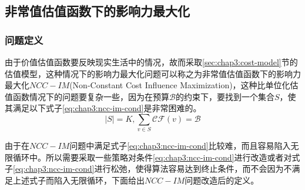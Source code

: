 



\subsection{非常值估值函数下的影响力最大化}
\subsubsection{问题定义}
由于价值估值函数要反映现实生活中的情况，故而采取\ref{sec:chap3:cost-model}节的估值模型，这种情况下的影响力最大化问题可以称之为非常值估值函数下的影响力最大化$NCC-IM$(Non-Constant Cost Influence Maximization)，这种比单位化估值函数情况下的问题要复杂一些，因为在预算$\mathcal{B}$的约束下，要找到一个集合$S$，使其满足以下式子\ref{eq:chap3:ncc-im-cond}是非常困难的。
\begin{equation}
\label{eq:chap3:ncc-im-cond}
|S|=K, \sum_{v \in S} \mathcal{CF}(v) = \mathcal{B}
\end{equation}


由于在$NCC-IM$问题中满足式子\ref{eq:chap3:ncc-im-cond}比较难，而且容易陷入无限循环中。所以需要采取一些策略对条件\ref{eq:chap3:ncc-im-cond}进行改造或者对式子\ref{eq:chap3:ncc-im-cond}进行松弛，使得算法容易达到终止条件，而不会因为不满足上述式子而陷入无限循环，下面给出$NCC-IM$问题改造后的定义。


